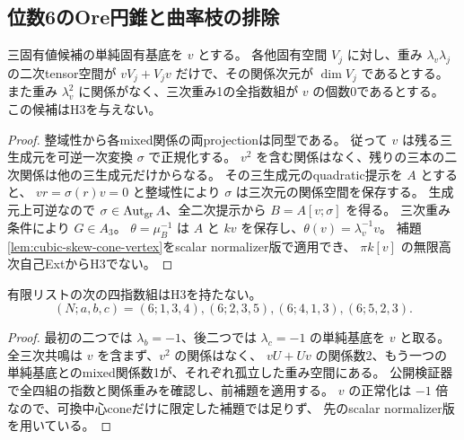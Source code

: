 \subsection{位数6のOre円錐と曲率枝の排除}
\label{subsec:cubic-sixth-root-spectrum}
\begin{lemma}[有限重みから強制されるOre円錐]
\label{lem:cubic-finite-spectrum-forced-cone}
三固有値候補の単純固有基底を $v$ とする。
各他固有空間 $V_j$ に対し、重み $\lambda_v\lambda_j$ の二次tensor空間が
$vV_j+V_jv$ だけで、その関係次元が $\dim V_j$ であるとする。
また重み $\lambda_v^2$ に関係がなく、三次重み1の全指数組が $v$ の個数0であるとする。
この候補はH3を与えない。
\end{lemma}
\begin{proof}
整域性から各mixed関係の両projectionは同型である。
従って $v$ は残る三生成元を可逆一次変換 $\sigma$ で正規化する。
$v^2$ を含む関係はなく、残りの三本の二次関係は他の三生成元だけからなる。
その三生成元のquadratic提示を $A$ とすると、
$v r=\sigma(r)v=0$ と整域性により $\sigma$ は三次元の関係空間を保存する。
生成元上可逆なので $\sigma\in\operatorname{Aut}_{\rm gr}A$、全二次提示から $B=A[v;\sigma]$ を得る。
三次重み条件により $G\in A_3$。
$\theta=\mu_B^{-1}$ は $A$ と $kv$ を保存し、$\theta(v)=\lambda_v^{-1}v$。
補題\ref{lem:cubic-skew-cone-vertex}をscalar normalizer版で適用でき、
$\pi k[v]$ の無限高次自己ExtからH3でない。
\end{proof}

\begin{proposition}[位数6の四つの円錐スペクトルの排除]
\label{prop:cubic-sixth-root-four-cones}
有限リストの次の四指数組はH3を持たない。
\[
 (N;a,b,c)=(6;1,3,4),(6;2,3,5),(6;4,1,3),(6;5,2,3).
\]
\end{proposition}
\begin{proof}
最初の二つでは $\lambda_b=-1$、後二つでは $\lambda_c=-1$ の単純基底を $v$ と取る。
全三次共鳴は $v$ を含まず、$v^2$ の関係はなく、
$vU+Uv$ の関係数2、もう一つの単純基底とのmixed関係数1が、それぞれ孤立した重み空間にある。
公開検証器で全四組の指数と関係重みを確認し、前補題を適用する。
$v$ の正常化は $-1$ 倍なので、可換中心coneだけに限定した補題では足りず、
先のscalar normalizer版を用いている。
\end{proof}


